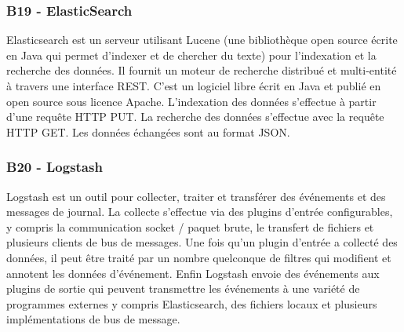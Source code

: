 	\subsubsection{B19 - ElasticSearch}
	Elasticsearch est un serveur utilisant Lucene (une bibliothèque open source écrite en Java qui permet d'indexer et de chercher du texte) pour l'indexation et la recherche des données. Il fournit un moteur de recherche distribué et multi-entité à travers une interface REST. C'est un logiciel libre écrit en Java et publié en open source sous licence Apache.
L'indexation des données s'effectue à partir d'une requête HTTP PUT. La recherche des données s'effectue avec la requête HTTP GET. Les données échangées sont au format JSON.
	
	\subsubsection{B20 - Logstash}
	Logstash est un outil pour collecter, traiter et transférer des événements et des messages de journal. La collecte s'effectue via des plugins d'entrée configurables, y compris la communication socket / paquet brute, le transfert de fichiers et plusieurs clients de bus de messages. Une fois qu'un plugin d'entrée a collecté des données, il peut être traité par un nombre quelconque de filtres qui modifient et annotent les données d'événement. Enfin Logstash envoie des événements aux plugins de sortie qui peuvent transmettre les événements à une variété de programmes externes y compris Elasticsearch, des fichiers locaux et plusieurs implémentations de bus de message.
	
